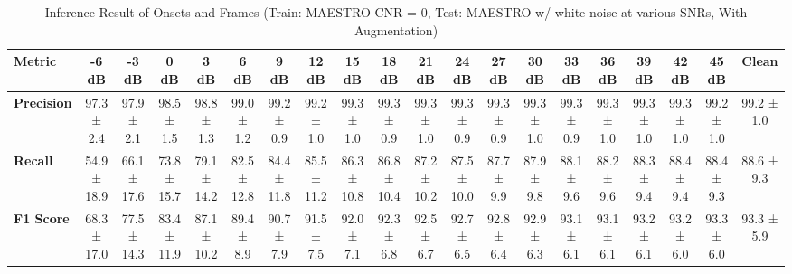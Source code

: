\documentclass{article}
\begin{document}
\begin{table*}[htbp]
\centering
\caption{Inference Result of Onsets and Frames (Train: MAESTRO CNR = 0, Test: MAESTRO w/ white noise at various SNRs, With Augmentation)}
\begin{adjustbox}{max width=\textwidth}
\begin{tabular}{@{}lccccccccccccccccccc@{}}
\toprule
\textbf{Metric} & \textbf{-6 dB} & \textbf{-3 dB} & \textbf{0 dB} & \textbf{3 dB} & \textbf{6 dB} & \textbf{9 dB} & \textbf{12 dB} & \textbf{15 dB} & \textbf{18 dB} & \textbf{21 dB} & \textbf{24 dB} & \textbf{27 dB} & \textbf{30 dB} & \textbf{33 dB} & \textbf{36 dB} & \textbf{39 dB} & \textbf{42 dB} & \textbf{45 dB} & \textbf{Clean} \\ 
\midrule
\textbf{Precision} & 97.3 ± 2.4 & 97.9 ± 2.1 & 98.5 ± 1.5 & 98.8 ± 1.3 & 99.0 ± 1.2 & 99.2 ± 0.9 & 99.2 ± 1.0 & 99.3 ± 1.0 & 99.3 ± 0.9 & 99.3 ± 1.0 & 99.3 ± 0.9 & 99.3 ± 0.9 & 99.3 ± 1.0 & 99.3 ± 0.9 & 99.3 ± 1.0 & 99.3 ± 1.0 & 99.3 ± 1.0 & 99.2 ± 1.0 & 99.2 ± 1.0 \\
\textbf{Recall}    & 54.9 ± 18.9 & 66.1 ± 17.6 & 73.8 ± 15.7 & 79.1 ± 14.2 & 82.5 ± 12.8 & 84.4 ± 11.8 & 85.5 ± 11.2 & 86.3 ± 10.8 & 86.8 ± 10.4 & 87.2 ± 10.2 & 87.5 ± 10.0 & 87.7 ± 9.9 & 87.9 ± 9.8 & 88.1 ± 9.6 & 88.2 ± 9.6 & 88.3 ± 9.4 & 88.4 ± 9.4 & 88.4 ± 9.3 & 88.6 ± 9.3 \\
\textbf{F1 Score}  & 68.3 ± 17.0 & 77.5 ± 14.3 & 83.4 ± 11.9 & 87.1 ± 10.2 & 89.4 ± 8.9 & 90.7 ± 7.9 & 91.5 ± 7.5 & 92.0 ± 7.1 & 92.3 ± 6.8 & 92.5 ± 6.7 & 92.7 ± 6.5 & 92.8 ± 6.4 & 92.9 ± 6.3 & 93.1 ± 6.1 & 93.1 ± 6.1 & 93.2 ± 6.1 & 93.2 ± 6.0 & 93.3 ± 6.0 & 93.3 ± 5.9 \\
\bottomrule
\end{tabular}
\end{adjustbox}
\end{table*}
\end{document}
